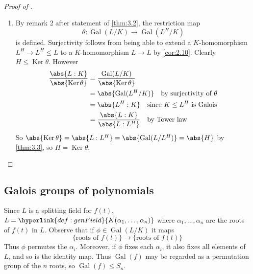 \documentclass{article}
\DeclareMathOperator{\Gal}{Gal}
\DeclareMathOperator{\Ker}{Ker}
\begin{document}
\begin{proof}[Proof of ]
\begin{enumerate}[label=(\roman*)]
        \item By remark 2 after statement of \cref{thm:3.2}, the restriction map
            \begin{equation*}\theta:\Gal(L/K) \rightarrow \Gal(L^H/K)\end{equation*}
            is defined.
            Surjectivity follows from being able to extend a $K$-homomorphism $L^H \to L^H \leq L$ to a $K$-homomorphism $L \to L$ by \cref{cor:2.10}.
            Clearly $H \leq \Ker \theta$. However
            \begin{align*}
                \frac{\abs{L:K}}{\abs{\Ker \theta}} &= \frac{\Gal(L/K)}{\abs{\Ker \theta}} \\
                                                    &= \abs{\Gal(L^H/K)} \quad \text{by surjectivity of } \theta \\
                                                    &= \abs{L^H:K} \quad \text{since } K \leq L^H \text{ is Galois} \\
                                                    &= \frac{\abs{L:K}}{\abs{L:L^H}} \quad \text{by Tower law}
            \end{align*}
            So $\abs{\Ker \theta} = \abs{L:L^H} = \abs{\Gal(L/L^H)} = \abs{H}$ by \cref{thm:3.3}, so $H = \Ker \theta$. \qedhere
    \end{enumerate}
\end{proof}

\subsection{Galois groups of polynomials}

Since $L$ is a splitting field for $f(t)$, $L = \hyperlink{def:genField}{K(\alpha_1, \dotsc, \alpha_n)}$ where $\alpha_1, \dotsc, \alpha_n$ are the roots of $f(t)$ in $L$.
Observe that if $\phi \in \Gal(L/K)$ it maps
\begin{equation*}
    \{\text{roots of } f(t)\} \longrightarrow \{\text{roots of } f(t)\}
\end{equation*}
Thus $\phi$ permutes the $\alpha_i$.
Moreover, if $\phi$ fixes each $\alpha_i$, it also fixes all elements of $L$, and so is the identity map.
Thus $\Gal(f)$ may be regarded as a permutation group of the $n$ roots, so $\Gal(f) \leq S_n$.
\end{document}
